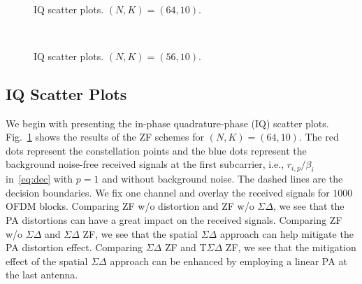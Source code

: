 \documentclass[10pt,twocolumn,twoside]{IEEEtran}
\begin{document}
\begin{figure}[t]
	\centering
	\\
	\caption{IQ scatter plots. ${(N,K) = (64,10)}$.}
	\label{fig_scatter_zf_64_10}
\end{figure}


\begin{figure}[t]
	\centering
	\\
	\caption{IQ scatter plots. ${(N,K) = (56,10)}$.}
	\label{fig_scatter_zf_56_10}
\end{figure}


\subsection{IQ Scatter Plots}

We begin with presenting the in-phase quadrature-phase (IQ) scatter plots.
Fig.~\ref{fig_scatter_zf_64_10} shows the results of the ZF schemes for $(N,K) = (64,10)$.
The red dots represent the constellation points and the blue dots represent the background noise-free received signals at the first subcarrier, i.e., $r_{i,p}/\beta_i$ in~\eqref{eq:dec} with $p=1$ and without background noise.
The dashed lines are the decision boundaries.
We fix one channel and overlay the received signals for $1000$ OFDM blocks.
Comparing ZF w/o distortion and ZF w/o $\Sigma \Delta$, we see that the PA distortions can have a great impact on the received signals.
Comparing ZF w/o $\Sigma \Delta$ and $\Sigma \Delta$ ZF, we see that the spatial $\Sigma \Delta$ approach can help mitigate the PA distortion effect.
Comparing $\Sigma \Delta$ ZF and T$\Sigma \Delta$ ZF, we see that the mitigation effect of the spatial $\Sigma \Delta$ approach can be enhanced by employing a linear PA at the last antenna.
\end{document}
